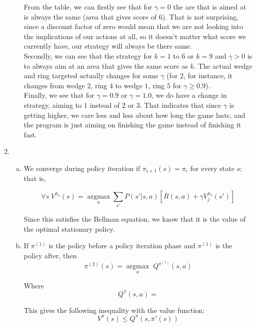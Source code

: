 \documentclass{article}
\begin{document}
\begin{enumerate}
\begin{enumerate}[(a)]
                From the table, we can firstly see that for $\gamma=0$ the are that is aimed at is always the same (area that gives score of $6$). That is not surprising, since a discount factor of zero would mean that we are not looking into the implications of our actions at all, so it doesn't matter what score we currently have, our strategy will always be there same.\\

                Secondly, we can see that the strategy for $k=1$ to $6$ or $k=9$ and $\gamma>0$ is to always aim at an area that gives the same score as $k$. The actual wedge and ring targeted actually changes for some $\gamma$ (for $2$, for instance, it changes from wedge $2$, ring $4$ to wedge $1$, ring $5$ for $\gamma\ge0.9$).\\

                Finally, we see that for $\gamma=0.9$ or $\gamma=1.0$, we do have a change in strategy,  aiming to $1$ instead of $2$ or $3$. That indicates that since $\gamma$ is getting higher, we care less and less about how long the game lasts, and the program is just aiming on finishing the game instead of finishing it fast.
            \end{enumerate}        

        \newpage
        \item
            \begin{enumerate}[(a)]
                \item We converge during policy iteration if $\pi_{i+1}(s) = \pi_{i}$ for every state $s$; that is, 

                $$\forall s \; V^{\pi_k}(s) = \underset{a}{\operatorname{argmax}} \sum_{s'} P(s' | s, a) [R(s, a) + \gamma V_j^{\pi_k}(s')]$$

                Since this satisfies the Bellman equation, we know that it is the value of the optimal stationary policy.
                
                \item If $\pi^{(1)}$ is the policy before a policy iteration phase and $\pi^{(1)}$ is the policy after, then $$\pi^{(2)}(s) = \underset{a}{\operatorname{argmax}} \; Q^{\pi^{(1)}}(s, a)$$

                Where $$Q^{\pi}(s, a) = $$

                This gives the following inequality with the value function: $$V^{\pi}(s) \leq Q^{\pi} (s, \pi'(s))$$


\end{enumerate}
\end{enumerate}
\end{document}
